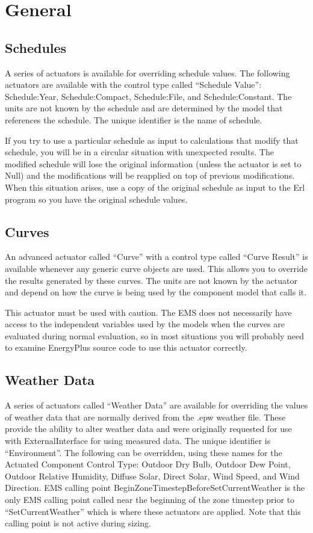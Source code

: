 \section{General}\label{general}

\subsection{Schedules}\label{schedules}

A series of actuators is available for overriding schedule values. The following actuators are available with the control type called ``Schedule Value'':~ Schedule:Year, Schedule:Compact, Schedule:File, and Schedule:Constant. The units are not known by the schedule and are determined by the model that references the schedule. The unique identifier is the name of schedule.

If you try to use a particular schedule as input to calculations that modify that schedule, you will be in a circular situation with unexpected results. The modified schedule will lose the original information (unless the actuator is set to Null) and the modifications will be reapplied on top of previous modifications. When this situation arises, use a copy of the original schedule as input to the Erl program so you have the original schedule values.

\subsection{Curves}\label{curves}

An advanced actuator called ``Curve'' with a control type called ``Curve Result'' is available whenever any generic curve objects are used. This allows you to override the results generated by these curves. The units are not known by the actuator and depend on how the curve is being used by the component model that calls it.

This actuator must be used with caution. The EMS does not necessarily have access to the independent variables used by the models when the curves are evaluated during normal evaluation, so in most situations you will probably need to examine EnergyPlus source code to use this actuator correctly.

\subsection{Weather Data}\label{weather-data}

A series of actuators called ``Weather Data'' are available for overriding the values of weather data that are normally derived from the .epw weather file. These provide the ability to alter weather data and were originally requested for use with ExternalInterface for using measured data. The unique identifier is ``Environment''. The following can be overridden, using these names for the Actuated Component Control Type: Outdoor Dry Bulb, Outdoor Dew Point, Outdoor Relative Humidity, Diffuse Solar, Direct Solar, Wind Speed, and Wind Direction. EMS calling point BeginZoneTimestepBeforeSetCurrentWeather is the only EMS calling point called near the beginning of the zone timestep prior to ``SetCurrentWeather'' which is where these actuators are applied. Note that this calling point is not active during sizing.
